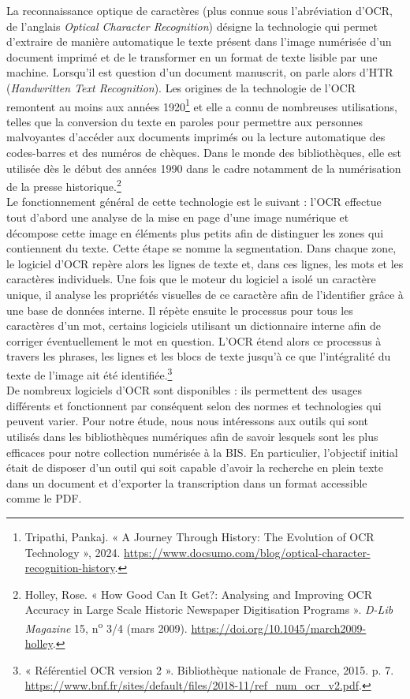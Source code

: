 \documentclass[a4paper,12pt,twoside]{book}
\begin{document}
La reconnaissance optique de caractères (plus connue sous l'abréviation
d'OCR, de l'anglais \emph{Optical Character Recognition}) désigne la
technologie qui permet d'extraire de manière automatique le texte
présent dans l'image numérisée d'un document imprimé et de le
transformer en un format de texte lisible par une machine. Lorsqu'il est
question d'un document manuscrit, on parle alors d'HTR
(\emph{Handwritten Text Recognition}). Les origines de la technologie de
l'OCR remontent au moins aux années 1920\footnote{Tripathi, Pankaj. « A
	Journey Through History: The Evolution of OCR Technology », 2024.
	\url{https://www.docsumo.com/blog/optical-character-recognition-history}.}
et elle a connu de nombreuses utilisations, telles que la conversion du
texte en paroles pour permettre aux personnes malvoyantes d'accéder aux
documents imprimés ou la lecture automatique des codes-barres et des
numéros de chèques. Dans le monde des bibliothèques, elle est utilisée
dès le début des années 1990 dans le cadre notamment de la numérisation
de la presse historique.\footnote{Holley, Rose. « How Good Can It Get?:
	Analysing and Improving OCR Accuracy in Large Scale Historic Newspaper
	Digitisation Programs ». \emph{D-Lib Magazine} 15,
	n\textsuperscript{o} 3/4 (mars 2009).
	\url{https://doi.org/10.1045/march2009-holley}.} \\

Le fonctionnement général de cette technologie est le suivant : l'OCR
effectue tout d'abord une analyse de la mise en page d'une image
numérique et décompose cette image en éléments plus petits afin de
distinguer les zones qui contiennent du texte. Cette étape se nomme la
segmentation. Dans chaque zone, le logiciel d'OCR repère alors les
lignes de texte et, dans ces lignes, les mots et les caractères
individuels. Une fois que le moteur du logiciel a isolé un caractère
unique, il analyse les propriétés visuelles de ce caractère afin de
l'identifier grâce à une base de données interne. Il répète ensuite le
processus pour tous les caractères d'un mot, certains logiciels
utilisant un dictionnaire interne afin de corriger éventuellement le mot
en question. L'OCR étend alors ce processus à travers les phrases, les
lignes et les blocs de texte jusqu'à ce que l'intégralité du texte de l'image ait
été identifiée.\footnote{« Référentiel OCR version 2 ». Bibliothèque
	nationale de France, 2015. p. 7.
	\url{https://www.bnf.fr/sites/default/files/2018-11/ref_num_ocr_v2.pdf}.} \\

De nombreux logiciels d'OCR sont disponibles : ils permettent des usages
différents et fonctionnent par conséquent selon des normes et
technologies qui peuvent varier. Pour notre étude, nous nous intéressons
aux outils qui sont utilisés dans les bibliothèques numériques afin de
savoir lesquels sont les plus efficaces pour notre collection numérisée
à la BIS. En particulier, l'objectif initial était de disposer d'un outil qui soit capable d'avoir la recherche en plein texte dans un document et d'exporter la transcription dans un format accessible comme le PDF. \\
\end{document}
